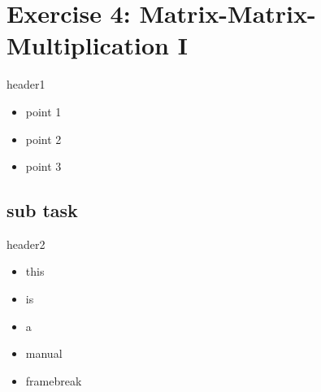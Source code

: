 \section{Exercise 4: Matrix-Matrix-Multiplication I}
\begin{frame}{header1}
\begin{itemize}
\item point 1
\item point 2
\item point 3
\end{itemize}
\end{frame}

\subsection{sub task}
\begin{frame}[allowframebreaks]{header2}
\begin{itemize}
\item this
\item is
\framebreak
\item a
\item manual
\framebreak
\item framebreak
\end{itemize}
\end{frame}
